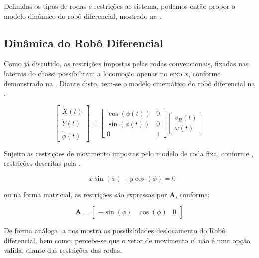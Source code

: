  Definidas os tipos de rodas e restrições ao sistema, podemos então propor o modelo dinâmico do robô diferencial, mostrado na .

\subsection{Dinâmica do Robô Diferencial}

Como já discutido, as restrições impostas pelas rodas convencionais, fixadas nas laterais do chassi possibilitam a locomoção apenas no eixo $x$, conforme demonstrado na . Diante disto, tem-se o modelo cinemático do robô diferencial na .

\begin{equation}
    \begin{bmatrix}
        \dot{X}(t) \\ \dot{Y}(t) \\ \dot{\phi}(t)
    \end{bmatrix}
    =
    \begin{bmatrix}
        \cos(\phi(t)) & 0 \\
        \sin(\phi(t)) & 0 \\
        0             & 1
    \end{bmatrix}
    \begin{bmatrix}
        v_R(t) \\ \omega(t)
    \end{bmatrix}
    \label{eq:modcinematico}
\end{equation}

Sujeito as restrições de movimento impostas pelo modelo de roda fixa, conforme , restrições descritas pela .

\begin{equation}
    -\dot{x}\sin(\phi) + \dot{y}\cos(\phi) = 0
    \label{eq:rstricoes}
\end{equation}

\noindent ou na forma matricial, as restrições são expressas por $\textbf{A}$, conforme:

\begin{equation}
    \mathbf{A} = 
    \begin{bmatrix}
        - \sin(\phi) & \cos(\phi) & 0
    \end{bmatrix}
    \label{eq:rstricoesmat}
\end{equation}

De forma análoga, a  nos mostra as possibilidades deslocamento do Robô diferencial, bem como, percebe-se que o vetor de movimento $v'$ não é uma opção valida, diante das restrições das rodas.

